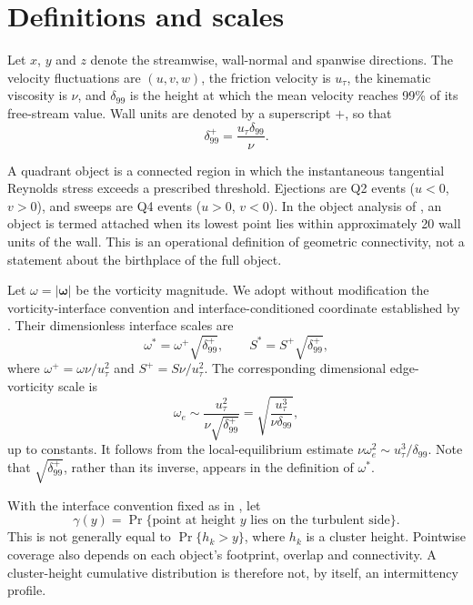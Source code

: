 \documentclass[11pt]{article}
\begin{document}
\section{Definitions and scales}

Let $x$, $y$ and $z$ denote the streamwise, wall-normal and spanwise directions.  The velocity fluctuations are $(u,v,w)$, the friction velocity is $u_\tau$, the kinematic viscosity is $\nu$, and $\delta_{99}$ is the height at which the mean velocity reaches 99\% of its free-stream value.  Wall units are denoted by a superscript $+$, so that
\begin{equation}
 \delta_{99}^{+}=\frac{u_\tau\delta_{99}}{\nu}.
\end{equation}

A quadrant object is a connected region in which the instantaneous tangential Reynolds stress exceeds a prescribed threshold.  Ejections are Q2 events ($u<0$, $v>0$), and sweeps are Q4 events ($u>0$, $v<0$).  In the object analysis of \citet{LozanoDuranEtAl2012}, an object is termed attached when its lowest point lies within approximately 20 wall units of the wall.  This is an operational definition of geometric connectivity, not a statement about the birthplace of the full object.

Let $\omega=|\bm{\omega}|$ be the vorticity magnitude. We adopt without modification the vorticity-interface convention and interface-conditioned coordinate established by \citet{BorrellJimenez2016}. Their dimensionless interface scales are
\begin{equation}
 \omega^{*}=\omega^{+}\sqrt{\delta_{99}^{+}},\qquad
 S^{*}=S^{+}\sqrt{\delta_{99}^{+}},
 \label{eq:star}
\end{equation}
where $\omega^+=\omega\nu/u_\tau^2$ and $S^+=S\nu/u_\tau^2$.
The corresponding dimensional edge-vorticity scale is
\begin{equation}
 \omega_e\sim \frac{u_\tau^2}{\nu\sqrt{\delta_{99}^{+}}}
 =\sqrt{\frac{u_\tau^3}{\nu\delta_{99}}},
\end{equation}
up to constants.  It follows from the local-equilibrium estimate $\nu\omega_e^2\sim u_\tau^3/\delta_{99}$.  Note that $\sqrt{\delta_{99}^{+}}$, rather than its inverse, appears in the definition of $\omega^*$.

With the interface convention fixed as in \citet{BorrellJimenez2016}, let
\begin{equation}
 \gamma(y)=\Pr\{\text{point at height }y\text{ lies on the turbulent side}\}.
 \label{eq:gamma}
\end{equation}
This is not generally equal to $\Pr\{h_k>y\}$, where $h_k$ is a cluster height. Pointwise coverage also depends on each object's footprint, overlap and connectivity. A cluster-height cumulative distribution is therefore not, by itself, an intermittency profile.
\end{document}
